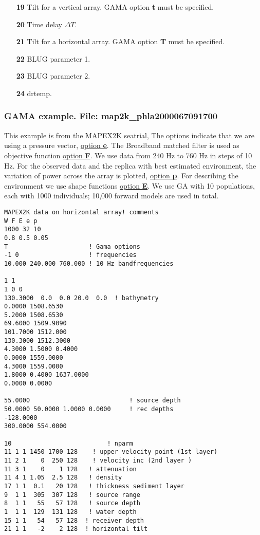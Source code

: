\documentclass{saclantc}
\begin{document}
\begin{itemize}
               {\tt index} refers to the actual point.
\vspace{-0.3cm}
    \item[\bf 19] Tilt for a vertical array. {\sf GAMA} option {\bf t} must be specified.
\vspace{-0.3cm}
    \item[\bf 20] Time delay $\Delta T$. 
\vspace{-0.3cm}
    \item[\bf 21] Tilt for a horizontal array. {\sf GAMA} option {\bf T} must be specified.
\vspace{-0.3cm}
    \item[\bf 22] BLUG parameter 1.
\vspace{-0.3cm}
    \item[\bf 23] BLUG parameter 2.
\vspace{-0.3cm}
    \item[\bf 24] drtemp.
\end{itemize}

\subsubsection{GAMA example. File: {\bf map2k\_phla2000067091700}}

\label{se:map2k} 
This example is from the MAPEX2K seatrial,
The options indicate that we are using a pressure vector, 
\underline{option {\bf e}}. 
The Broadband matched filter is used as objective function
\underline{option {\bf F}}.  
We use data from 240 Hz to 760 Hz in steps of  10 Hz.
For the observed data and the replica with best estimated environment,
the variation of power across the array is plotted, \underline{option {\bf p}}.
For describing the environment we use shape functions \underline{option {\bf E}}.
We use GA with 10 populations,
each with 1000 individuals; 10,000 forward models are used in total.

\small
\begin{verbatim}
MAPEX2K data on horizontal array! comments
W F E e p
1000 32 10
0.8 0.5 0.05
T                      ! Gama options
-1 0                   ! frequencies
10.000 240.000 760.000 ! 10 Hz bandfrequencies

1 1
1 0 0
130.3000  0.0  0.0 20.0  0.0  ! bathymetry
0.0000 1508.6530
5.2000 1508.6530
69.6000 1509.9090
101.7000 1512.000
130.3000 1512.3000
4.3000 1.5000 0.4000
0.0000 1559.0000
4.3000 1559.0000
1.8000 0.4000 1637.0000
0.0000 0.0000

55.0000                           ! source depth
50.0000 50.0000 1.0000 0.0000     ! rec depths
-128.0000
300.0000 554.0000

10                          ! nparm 
11 1 1 1450 1700 128    ! upper velocity point (1st layer)
11 2 1    0  250 128    ! velocity inc (2nd layer )
11 3 1    0    1 128   ! attenuation
11 4 1 1.05  2.5 128   ! density
17 1 1  0.1   20 128   ! thickness sediment layer 
9  1 1  305  307 128   ! source range  
8  1 1   55   57 128   ! source depth     
1  1 1  129  131 128   ! water depth
15 1 1   54   57 128  ! receiver depth
21 1 1   -2    2 128  ! horizontal tilt
\end{verbatim}
\normalsize
\end{document}
